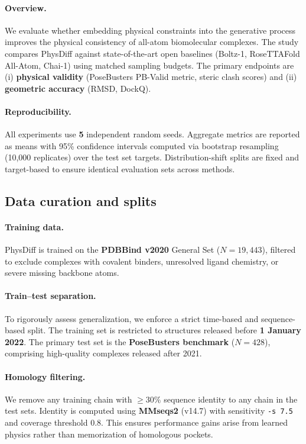 \documentclass[twocolumn,10pt]{article}
\newcommand{\modelname}{PhysDiff}
\begin{document}
\paragraph{Overview.}
We evaluate whether embedding physical constraints into the generative process improves the physical consistency of all-atom biomolecular complexes. The study compares \modelname{} against state-of-the-art open baselines (Boltz-1, RoseTTAFold All-Atom, Chai-1) using matched sampling budgets. The primary endpoints are (i) \textbf{physical validity} (PoseBusters PB-Valid metric, steric clash scores) and (ii) \textbf{geometric accuracy} (RMSD, DockQ).

\paragraph{Reproducibility.}
All experiments use \textbf{5} independent random seeds. Aggregate metrics are reported as means with 95\% confidence intervals computed via bootstrap resampling (10,000 replicates) over the test set targets. Distribution-shift splits are fixed and target-based to ensure identical evaluation sets across methods.

\subsection{Data curation and splits}

\paragraph{Training data.}
\modelname{} is trained on the \textbf{PDBBind v2020} General Set ($N=19,443$), filtered to exclude complexes with covalent binders, unresolved ligand chemistry, or severe missing backbone atoms. 
\paragraph{Train--test separation.}
To rigorously assess generalization, we enforce a strict time-based and sequence-based split. The training set is restricted to structures released before \textbf{1 January 2022}. The primary test set is the \textbf{PoseBusters benchmark} ($N=428$), comprising high-quality complexes released after 2021.
\paragraph{Homology filtering.}
We remove any training chain with $\ge 30\%$ sequence identity to any chain in the test sets. Identity is computed using \textbf{MMseqs2} (v14.7) with sensitivity \texttt{-s 7.5} and coverage threshold 0.8. This ensures performance gains arise from learned physics rather than memorization of homologous pockets.
\end{document}
